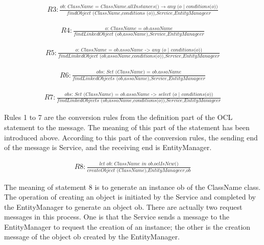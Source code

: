 \documentclass[pdflatex,sn-mathphys-num]{sn-jnl}%
\theoremstyle{thmstyleone}%
\theoremstyle{thmstyletwo}%
\theoremstyle{thmstylethree}%
\begin{document}
\[
\begin{array}{l}
    \textit{R3}: \frac{\textit{ob: ClassName = ClassName.allInstances() → any (o $|$ conditions(o))}}{\textit{findObject (ClassName,conditions (o)),Service,EntityManageer}}
\end{array}
\]

\[
\begin{array}{l}
    \textit{R4}: \frac{\textit{o: ClassName = ob.assoName}}{\textit{findLinkedObject (ob,assoName),Service,EntityManageer}}
\end{array}
\]

\[
\begin{array}{l}
    \textit{R5}: \frac{\textit{o: ClassName = ob.assoName -> any (o | conditions(o))}}{\textit{findLinkedObject (ob,assoName,conditions(o)),Service,EntityManageer}}
\end{array}
\]

\[
\begin{array}{l}
    \textit{R6}: \frac{\textit{obs: Set (ClassName) = ob.assoName}}{\textit{findLinkedObjects (ob,assoName),Service,EntityManageer}}
\end{array}
\]

\[
\begin{array}{l}
    \textit{R7}: \frac{\textit{obs: Set (ClassName) = ob.assoName -> select (o | conditions(o))}}{\textit{findLinkedObjects (ob,assoName,conditions(o)),Service,EntityManageer}}
\end{array}
\]

Rules 1 to 7 are the conversion rules from the definition part of the OCL statement to the message. The meaning of this part of the statement has been introduced above. According to this part of the conversion rules, the sending end of the message is Service, and the receiving end is EntityManager.

\[
\begin{array}{l}
    \textit{R8}: \frac{\textit{let ob: ClassName in ob.oclIsNew()}}{\textit{createObject (ClassName),EntityManageer,ob}}
\end{array}
\]

The meaning of statement 8 is to generate an instance ob of the ClassName class. The operation of creating an object is initiated by the Service and completed by the EntityManager to generate an object ob. There are actually two request messages in this process. One is that the Service sends a message to the EntityManager to request the creation of an instance; the other is the creation message of the object ob created by the EntityManager.
\end{document}
